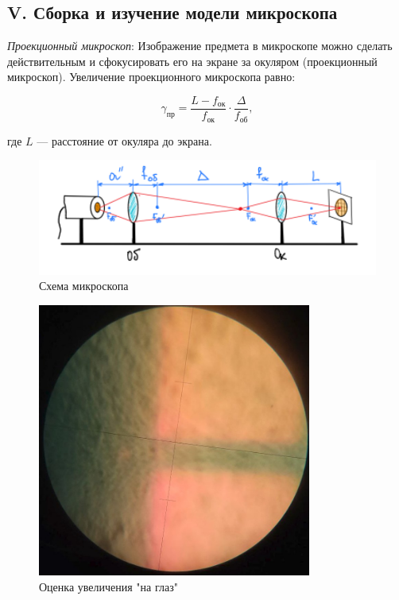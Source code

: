 \subsection*{V. Сборка и изучение модели микроскопа}

\textit{Проекционный микроскоп}:
Изображение предмета в микроскопе можно сделать действительным и сфокусировать его на экране за окуляром (проекционный микроскоп). Увеличение проекционного микроскопа равно:

\begin{equation}
\gamma_{\text{пр}} = \frac{L - f_{\text{ок}}}{f_{\text{ок}}} \cdot \frac{\Delta}{f_{\text{об}}},
\end{equation}

где $L$ --- расстояние от окуляра до экрана.
\begin{figure}[h!]
    \centering
    \includegraphics[width=14cm]{images/setup5.png}
    \caption {Схема микроскопа}
\end{figure}


\begin{figure}[h!]
    \centering
    \includegraphics[width=9cm]{images/task5.jpg}
    \caption {Оценка увеличения "на глаз"}
\end{figure}


